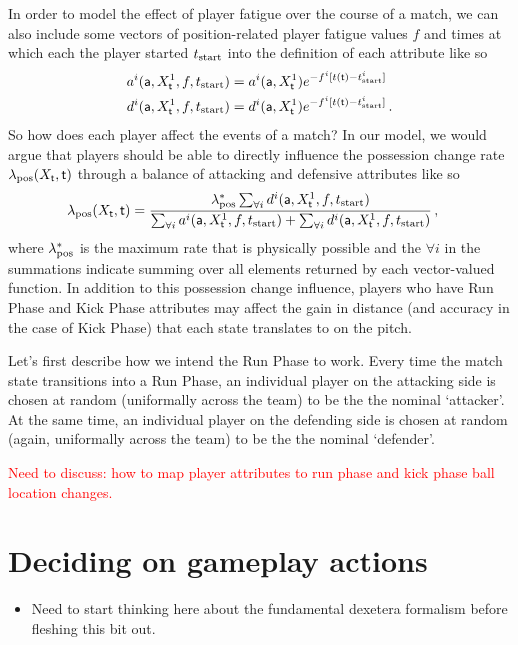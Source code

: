 In order to model the effect of player fatigue over the course of a match, we can also include some vectors of position-related player fatigue values $f$ and times at which each the player started $t_{\rm start}$ into the definition of each attribute like so
\begin{align}
a^i({\sf a}, X^1_{\sf t}, f, t_{\rm start}) &= a^i({\sf a}, X^1_{\sf t})e^{-f^i[t({\sf t})-t^i_{\rm start}]} \\
d^i({\sf a}, X^1_{\sf t}, f, t_{\rm start}) &= d^i({\sf a}, X^1_{\sf t})e^{-f^i[t({\sf t})-t^i_{\rm start}]} \,.
\end{align}
So how does each player affect the events of a match? In our model, we would argue that players should be able to directly influence the possession change rate $\lambda_{\rm pos}(X_{\sf t}, {\sf t})$ through a balance of attacking and defensive attributes like so
\begin{align}
\lambda_{\rm pos}(X_{\sf t}, {\sf t}) &= \frac{\lambda^*_{\rm pos}\sum_{\forall i}d^i({\sf a}, X^1_{\sf t}, f, t_{\rm start})}{\sum_{\forall i}a^i({\sf a}, X^1_{\sf t}, f, t_{\rm start}) + \sum_{\forall i}d^i({\sf a}, X^1_{\sf t}, f, t_{\rm start})}\,,
\end{align}
where $\lambda^*_{\rm pos}$ is the maximum rate that is physically possible and the $\forall i$ in the summations indicate summing over all elements returned by each vector-valued function. In addition to this possession change influence, players who have {\sf Run Phase} and {\sf Kick Phase} attributes may affect the gain in distance (and accuracy in the case of {\sf Kick Phase}) that each state translates to on the pitch. 

Let's first describe how we intend the {\sf Run Phase} to work. Every time the match state transitions into a {\sf Run Phase}, an individual player on the attacking side is chosen at random (uniformally across the team) to be the the nominal `attacker'. At the same time, an individual player on the defending side is chosen at random (again, uniformally across the team) to be the the nominal `defender'. 

\textcolor{red}{Need to discuss: how to map player attributes to run phase and kick phase ball location changes.}

\section{\sffamily Deciding on gameplay actions}


\begin{itemize}
\item{Need to start thinking here about the fundamental dexetera formalism before fleshing this bit out.}
\end{itemize}

